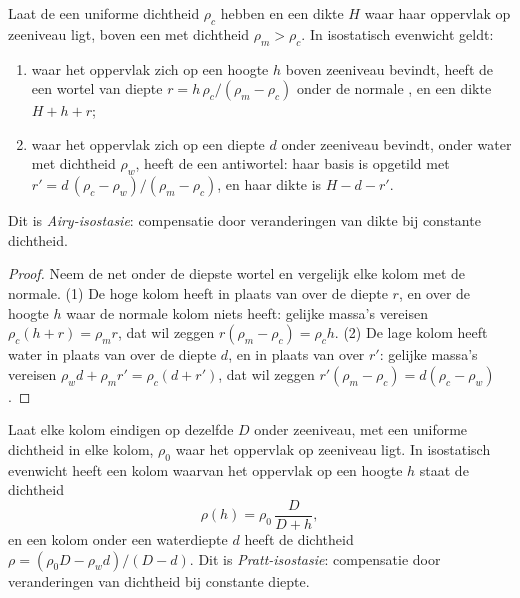 \begin{proposition}\label{prop:b1:isostasy-gravity:airy}
Laat de  een uniforme dichtheid $\rho_c$ hebben en een dikte $H$ waar haar oppervlak op zeeniveau ligt, boven een  met dichtheid $\rho_m > \rho_c$. In isostatisch evenwicht geldt:
\begin{enumerate}
  \item waar het oppervlak zich op een hoogte $h$ boven zeeniveau bevindt, heeft de  een wortel van diepte $r = h\,\rho_c/(\rho_m - \rho_c)$ onder de normale , en een dikte $H + h + r$;
  \item waar het oppervlak zich op een diepte $d$ onder zeeniveau bevindt, onder water met dichtheid $\rho_w$, heeft de  een antiwortel: haar basis is opgetild met $r' = d\,(\rho_c - \rho_w)/(\rho_m - \rho_c)$, en haar dikte is $H - d - r'$.
\end{enumerate}
Dit is \emph{Airy-isostasie}: compensatie door veranderingen van dikte bij constante dichtheid.
\end{proposition}

\begin{proof}
Neem de  net onder de diepste wortel en vergelijk elke kolom met de normale. (1) De hoge kolom heeft  in plaats van  over de diepte $r$, en  over de hoogte $h$ waar de normale kolom niets heeft: gelijke massa's vereisen $\rho_c(h + r) = \rho_m r$, dat wil zeggen
$r(\rho_m - \rho_c) = \rho_c h$. (2) De lage kolom heeft water in plaats van  over de diepte $d$, en  in plaats van  over $r'$: gelijke massa's vereisen $\rho_w d + \rho_m r' = \rho_c(d + r')$, dat wil zeggen $r'(\rho_m - \rho_c) =
d(\rho_c - \rho_w)$.
\end{proof}

\begin{proposition}\label{prop:b1:isostasy-gravity:pratt}
Laat elke kolom eindigen op dezelfde  $D$ onder zeeniveau, met een uniforme dichtheid in elke kolom, $\rho_0$ waar het oppervlak op zeeniveau ligt. In isostatisch evenwicht heeft een kolom waarvan het oppervlak op een hoogte $h$ staat de dichtheid
\[
  \rho(h) = \rho_0\,\frac{D}{D + h},
\]
en een kolom onder een waterdiepte $d$ heeft de dichtheid $\rho = (\rho_0 D - \rho_w d)/(D - d)$. Dit is \emph{Pratt-isostasie}: compensatie door veranderingen van dichtheid bij constante diepte.
\end{proposition}

